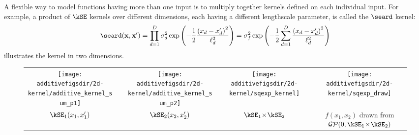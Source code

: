 A flexible way to model functions having more than one input is to multiply together kernels defined on each individual input.
For example, a product of $\kSE$ kernels over different dimensions, each having a different lengthscale parameter, is called the $\seard$ kernel:
%
\begin{align}
\seard( \vx, \vx')
 = \prod_{d=1}^D \sigma_d^2 \exp \left( -\frac{1}{2} \frac{\left( x_d - x'_d \right)^2}{\ell_d^2} \right)
 = \sigma_f^2 \exp \left( -\frac{1}{2} \sum_{d=1}^D \frac{\left( x_d - x'_d \right)^2}{\ell_d^2} \right)
\end{align}
%
 illustrates the \seard{} kernel in two dimensions.
%
\begin{figure}[ht!]
\centering
\begin{tabular}{ccccccc}
\texttt{[image: \\additivefigsdir/2d-kernel/additive\_kernel\_sum\_p1]} \hspace{-0.3cm}
& \hspace{-0.3cm} \raisebox{1cm}{$\times$} & 
\hspace{-0.3cm}\texttt{[image: \\additivefigsdir/2d-kernel/additive\_kernel\_sum\_p2]} \hspace{-0.3cm}
& \hspace{-0.2cm} \raisebox{1cm}{=} \hspace{-0.2cm} & \hspace{-0.3cm}
\texttt{[image: \\additivefigsdir/2d-kernel/sqexp\_kernel]} 
& \hspace{-0.3cm} \raisebox{1cm}{$\rightarrow$} \hspace{-0.3cm} & \hspace{-0.3cm}
\texttt{[image: \\additivefigsdir/2d-kernel/sqexp\_draw]}\\
$\kSE_1(x_1, x_1')$ &  & $\kSE_2(x_2, x_2')$ &  & \hspace{-0.4cm} $\kSE_1 \kerntimes \kSE_2$ & & \hspace{-0.5cm} \parbox{0.24\columnwidth}{$f(x_1, x_2)$ drawn from $\GPt{0}{\kSE_1 \kerntimes \kSE_2}$} \\

\end{tabular}
\end{figure}
